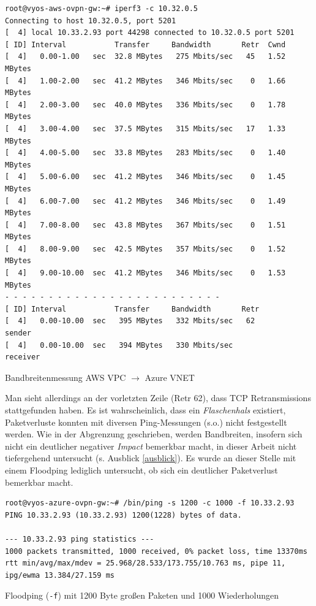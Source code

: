 \begin{listing}[h]
\begin{verbatim}
root@vyos-aws-ovpn-gw:~# iperf3 -c 10.32.0.5
Connecting to host 10.32.0.5, port 5201
[  4] local 10.33.2.93 port 44298 connected to 10.32.0.5 port 5201
[ ID] Interval           Transfer     Bandwidth       Retr  Cwnd
[  4]   0.00-1.00   sec  32.8 MBytes   275 Mbits/sec   45   1.52 MBytes
[  4]   1.00-2.00   sec  41.2 MBytes   346 Mbits/sec    0   1.66 MBytes
[  4]   2.00-3.00   sec  40.0 MBytes   336 Mbits/sec    0   1.78 MBytes
[  4]   3.00-4.00   sec  37.5 MBytes   315 Mbits/sec   17   1.33 MBytes
[  4]   4.00-5.00   sec  33.8 MBytes   283 Mbits/sec    0   1.40 MBytes
[  4]   5.00-6.00   sec  41.2 MBytes   346 Mbits/sec    0   1.45 MBytes
[  4]   6.00-7.00   sec  41.2 MBytes   346 Mbits/sec    0   1.49 MBytes
[  4]   7.00-8.00   sec  43.8 MBytes   367 Mbits/sec    0   1.51 MBytes
[  4]   8.00-9.00   sec  42.5 MBytes   357 Mbits/sec    0   1.52 MBytes
[  4]   9.00-10.00  sec  41.2 MBytes   346 Mbits/sec    0   1.53 MBytes
- - - - - - - - - - - - - - - - - - - - - - - - -
[ ID] Interval           Transfer     Bandwidth       Retr
[  4]   0.00-10.00  sec   395 MBytes   332 Mbits/sec   62             sender
[  4]   0.00-10.00  sec   394 MBytes   330 Mbits/sec                  receiver
\end{verbatim}
\caption{Bandbreitenmessung AWS VPC $\rightarrow$ Azure VNET}
\label{iperf3-vpc-vnet}
\end{listing}
Man sieht allerdings an der vorletzten Zeile (\glqq Retr 62\grqq{}), dass TCP Retransmissions stattgefunden haben. Es ist wahrscheinlich, dass ein \textit{Flaschenhals} existiert, Paketverluste konnten mit diversen Ping-Messungen (s.o.) nicht festgestellt werden. Wie in der Abgrenzung geschrieben, werden Bandbreiten, insofern sich nicht ein deutlicher negativer \textit{Impact} bemerkbar macht, in dieser Arbeit nicht tiefergehend untersucht (s. Ausblick \ref{ausblick}). Es wurde an dieser Stelle mit einem Floodping lediglich untersucht, ob sich ein deutlicher Paketverlust bemerkbar macht.
\begin{listing}[h]
\begin{verbatim}
root@vyos-azure-ovpn-gw:~# /bin/ping -s 1200 -c 1000 -f 10.33.2.93
PING 10.33.2.93 (10.33.2.93) 1200(1228) bytes of data.

--- 10.33.2.93 ping statistics ---
1000 packets transmitted, 1000 received, 0% packet loss, time 13370ms
rtt min/avg/max/mdev = 25.968/28.533/173.755/10.763 ms, pipe 11, ipg/ewma 13.384/27.159 ms
\end{verbatim}
\caption{Floodping (\texttt{-f}) mit 1200 Byte großen Paketen und 1000 Wiederholungen}
\label{floodping}
\end{listing}\FloatBarrier

